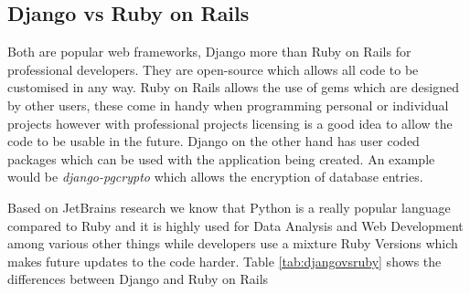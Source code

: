 \documentclass[../main.tex]{subfiles}
\begin{document}
      
\subsection{Django vs Ruby on Rails} 
Both are popular web frameworks, Django more than Ruby on Rails for professional developers. They are open-source which allows all code to be customised in any way. Ruby on Rails allows the use of gems which are designed by other users, these come in handy when programming personal or individual projects however with professional projects licensing is a good idea to allow the code to be usable in the future\cite{djangovsrails}. Django on the other hand has user coded packages which can be used with the application being created. An example would be \textit{django-pgcrypto}\cite{dbencrypt} which allows the encryption of database entries. 

Based on JetBrains research\cite{pythonresearch2018}\cite{rubyresearch2018} we know that Python is a really popular language compared to Ruby and it is highly used for Data Analysis and Web Development among various other things while developers use a mixture Ruby Versions which makes future updates to the code harder. Table \ref{tab:djangovsruby} shows the differences between Django and Ruby on Rails
\end{document}
